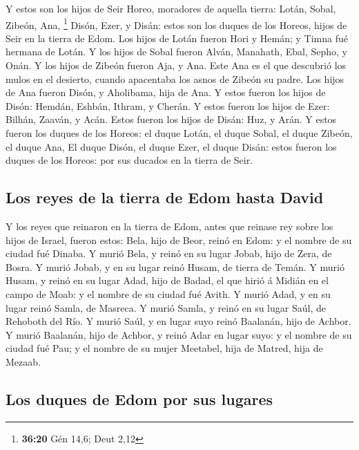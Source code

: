  Y estos son los hijos de Seir Horeo, moradores de
aquella tierra: Lotán, Sobal, Zibeón, Ana, \footnote{\textbf{36:20} Gén
  14,6; Deut 2,12}  Disón, Ezer, y Disán: estos son los
duques de los Horeos, hijos de Seir en la tierra de Edom.
 Los hijos de Lotán fueron Hori y Hemán; y Timna fué
hermana de Lotán.  Y los hijos de Sobal fueron Alván,
Manahath, Ebal, Sepho, y Onán.  Y los hijos de Zibeón
fueron Aja, y Ana. Este Ana es el que descubrió los mulos en el
desierto, cuando apacentaba los asnos de Zibeón su padre.
 Los hijos de Ana fueron Disón, y Aholibama, hija de Ana.
 Y estos fueron los hijos de Disón: Hemdán, Eshbán,
Ithram, y Cherán.  Y estos fueron los hijos de Ezer:
Bilhán, Zaaván, y Acán.  Estos fueron los hijos de Disán:
Huz, y Arán.  Y estos fueron los duques de los Horeos: el
duque Lotán, el duque Sobal, el duque Zibeón, el duque Ana,
 El duque Disón, el duque Ezer, el duque Disán: estos
fueron los duques de los Horeos: por sus ducados en la tierra de Seir.

\hypertarget{los-reyes-de-la-tierra-de-edom-hasta-david}{%
\subsection{Los reyes de la tierra de Edom hasta
David}\label{los-reyes-de-la-tierra-de-edom-hasta-david}}

 Y los reyes que reinaron en la tierra de Edom, antes que
reinase rey sobre los hijos de Israel, fueron estos: 
Bela, hijo de Beor, reinó en Edom: y el nombre de su ciudad fué Dinaba.
 Y murió Bela, y reinó en su lugar Jobab, hijo de Zera,
de Bosra.  Y murió Jobab, y en su lugar reinó Husam, de
tierra de Temán.  Y murió Husam, y reinó en su lugar
Adad, hijo de Badad, el que hirió á Midián en el campo de Moab: y el
nombre de su ciudad fué Avith.  Y murió Adad, y en su
lugar reinó Samla, de Masreca.  Y murió Samla, y reinó en
su lugar Saúl, de Rehoboth del Río.  Y murió Saúl, y en
lugar suyo reinó Baalanán, hijo de Achbor.  Y murió
Baalanán, hijo de Achbor, y reinó Adar en lugar suyo: y el nombre de su
ciudad fué Pau; y el nombre de su mujer Meetabel, hija de Matred, hija
de Mezaab.

\hypertarget{los-duques-de-edom-por-sus-lugares}{%
\subsection{Los duques de Edom por sus
lugares}\label{los-duques-de-edom-por-sus-lugares}}

